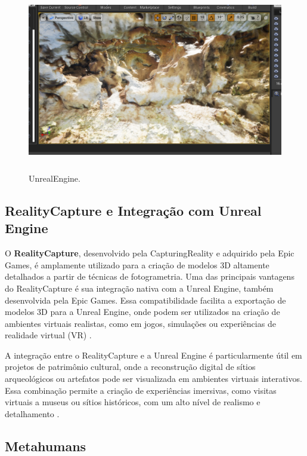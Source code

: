 \begin{figure}[H]
    \centering
    \includegraphics[height=8cm, keepaspectratio]{img/unreal-print2.png}
    \caption{UnrealEngine.}
    \label{fig:unreal-print2}
\end{figure}
\subsection{RealityCapture e Integração com Unreal Engine}
O \textbf{RealityCapture}, desenvolvido pela CapturingReality e adquirido pela Epic Games, é amplamente utilizado para a criação de modelos 3D altamente detalhados a partir de técnicas de fotogrametria. Uma das principais vantagens do RealityCapture é sua integração nativa com a Unreal Engine, também desenvolvida pela Epic Games. Essa compatibilidade facilita a exportação de modelos 3D para a Unreal Engine, onde podem ser utilizados na criação de ambientes virtuais realistas, como em jogos, simulações ou experiências de realidade virtual (VR) \citep{EpicGamesDocs}.

A integração entre o RealityCapture e a Unreal Engine é particularmente útil em projetos de patrimônio cultural, onde a reconstrução digital de sítios arqueológicos ou artefatos pode ser visualizada em ambientes virtuais interativos. Essa combinação permite a criação de experiências imersivas, como visitas virtuais a museus ou sítios históricos, com um alto nível de realismo e detalhamento \citep{ExemploArtigo}.
\subsection{Metahumans}

